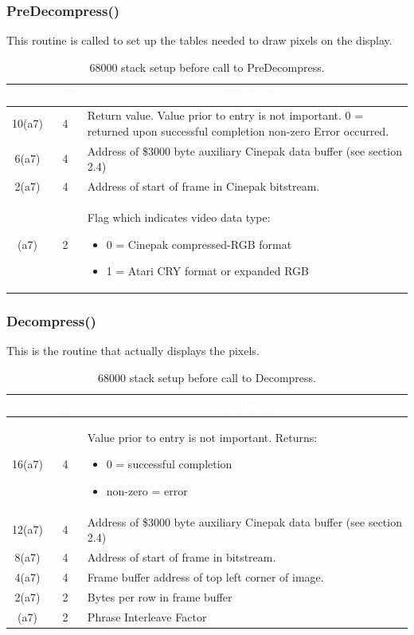 \documentclass[12pt,letterpaper,twoside]{article}
\newcommand{\tabheadtxt}[1]{\multicolumn{1}{c}{\textcolor{white}{\textbf{#1}}}}
\begin{document}
\subsubsection{PreDecompress()}
This routine is called to set up the tables needed to draw pixels on the display.

\begin{table}[h]
\centering
\begin{tabular}{|c|c|p{12cm}|}
\hline
\rowcolor{black}
\tabheadtxt{Stack Offset} & \tabheadtxt{Size} & \tabheadtxt{Description} \\
\hline
10(a7) & 4 & Return value. Value prior to entry is not important. 0 = returned upon successful completion non-zero Error occurred. \\
\hline
6(a7) & 4 & Address of \$3000 byte auxiliary Cinepak data buffer (see section 2.4) \\
\hline
2(a7) & 4 & Address of start of frame in Cinepak bitstream. \\
\hline
(a7) & 2 & Flag which indicates video data type:
	\begin{itemize}[nosep]
	\item[] 0 = Cinepak compressed-RGB format
	\item[] 1 = Atari CRY format or expanded RGB
	\end{itemize}\\
\hline
\end{tabular}
\caption{68000 stack setup before call to PreDecompress.}
\label{tab:predecompress}
\end{table}
\FloatBarrier

\subsubsection{Decompress()}
This is the routine that actually displays the pixels.

\begin{table}[h]
\centering
\begin{tabular}{|c|c|p{10cm}|}
\hline
\rowcolor{black}
\tabheadtxt{Stack Offset} & \tabheadtxt{Size} & \tabheadtxt{Description} \\
\hline
16(a7) & 4 & Value prior to entry is not important. Returns:
	\begin{itemize}[nosep]
	\item[] 0 = successful completion
	\item[] non-zero = error
	\end{itemize}\\
\hline
12(a7) & 4 & Address of \$3000 byte auxiliary Cinepak data buffer (see section 2.4) \\
\hline
8(a7) & 4 & Address of start of frame in bitstream. \\
\hline
4(a7) & 4 & Frame buffer address of top left corner of image. \\
\hline
2(a7) & 2 & Bytes per row in frame buffer \\
\hline
(a7) & 2 & Phrase Interleave Factor \\
\hline
\end{tabular}
\caption{68000 stack setup before call to Decompress.}
\label{tab:decompress}
\end{table}
\FloatBarrier
\end{document}
